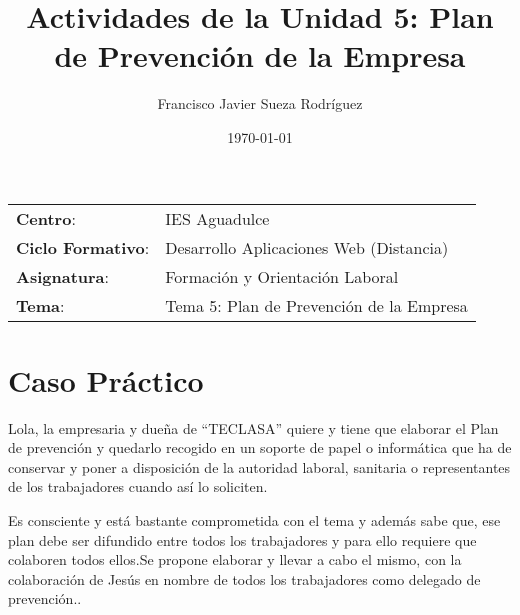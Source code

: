 


\title{
\vspace{10ex}
\normalfont \normalsize
\huge \textbf{Actividades de la Unidad 5: Plan de Prevención de la Empresa}
}
\author{Francisco Javier Sueza Rodríguez}
\date{\normalsize\today}



\maketitle

\thispagestyle{empty}

\vspace{65ex}

\begin{center}
    \begin{tabular}{l l}
        \textbf{Centro}: & IES Aguadulce \\
        \textbf{Ciclo Formativo}: & Desarrollo Aplicaciones Web (Distancia)\\
        \textbf{Asignatura}: & Formación y Orientación Laboral\\
        \textbf{Tema}: & Tema 5: Plan de Prevención de la Empresa\\
    \end{tabular}
\end{center}

\newpage

\tableofcontents

\newpage
\section{Caso Práctico}


Lola, la empresaria y dueña de ``TECLASA'' quiere y tiene que elaborar el Plan de prevención y quedarlo recogido en un soporte de papel o informática que ha de conservar y poner a disposición de la autoridad laboral, sanitaria o representantes de los trabajadores cuando así lo soliciten.

Es consciente y  está bastante comprometida con el tema y además sabe que, ese plan debe ser difundido entre todos los trabajadores y para ello requiere que  colaboren todos ellos.Se propone  elaborar y llevar a cabo el mismo, con la colaboración de Jesús en nombre de todos los trabajadores como delegado de prevención..

